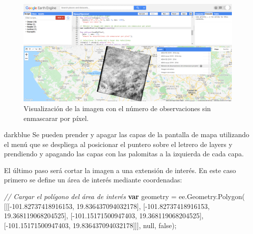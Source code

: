 \documentclass[
  12pt,
  letterpaper,
  twoside]{book}
\newenvironment{Shaded}{\begin{snugshade}}{\end{snugshade}}
\newcommand{\AttributeTok}[1]{\textcolor[rgb]{0.48,0.12,0.64}{#1}}
\newcommand{\CommentTok}[1]{\textcolor[rgb]{0.24,0.58,0.00}{\textit{#1}}}
\newcommand{\ControlFlowTok}[1]{\textcolor[rgb]{0.00,0.00,0.00}{\textbf{#1}}}
\newcommand{\FloatTok}[1]{\textcolor[rgb]{0.28,0.53,0.93}{#1}}
\newcommand{\FunctionTok}[1]{\textcolor[rgb]{0.48,0.12,0.64}{#1}}
\newcommand{\KeywordTok}[1]{\textcolor[rgb]{0.48,0.12,0.64}{#1}}
\newcommand{\NormalTok}[1]{#1}
\newcommand{\OperatorTok}[1]{\textcolor[rgb]{0.00,0.00,0.00}{#1}}
\begin{document}
\begin{figure}[H]

{\centering \includegraphics[width=0.95\linewidth]{Img/imCount} 

}

\caption{Visualización de la imagen con el número de observaciones sin enmascarar por píxel.}\label{fig:f1021}
\end{figure}

\begin{bluebox2}

\begin{awesomeblock}{5pt}{\faLightbulb}{darkblue}
Se pueden prender y apagar las capas de la pantalla de mapa utilizando el menú que se despliega al posicionar el puntero sobre el letrero de layers y prendiendo y apagando las capas con las palomitas a la izquierda de cada capa.

\end{awesomeblock}

\end{bluebox2}

El último paso será cortar la imagen a una extensión de interés. En este caso primero se define un área de interés mediante coordenadas:

\begin{Shaded}
\begin{Highlighting}[]
\CommentTok{// Cargar el polígono del área de interés}
\ControlFlowTok{var}\NormalTok{ geometry }\OperatorTok{=} \KeywordTok{ee}\OperatorTok{.}\AttributeTok{Geometry}\OperatorTok{.}\FunctionTok{Polygon}\NormalTok{(}
\NormalTok{        [[[}\OperatorTok{{-}}\FloatTok{101.82737418916153}\OperatorTok{,} \FloatTok{19.836437094032178}\NormalTok{]}\OperatorTok{,}
\NormalTok{          [}\OperatorTok{{-}}\FloatTok{101.82737418916153}\OperatorTok{,} \FloatTok{19.368119068204525}\NormalTok{]}\OperatorTok{,}
\NormalTok{          [}\OperatorTok{{-}}\FloatTok{101.15171500947403}\OperatorTok{,} \FloatTok{19.368119068204525}\NormalTok{]}\OperatorTok{,}
\NormalTok{          [}\OperatorTok{{-}}\FloatTok{101.15171500947403}\OperatorTok{,} \FloatTok{19.836437094032178}\NormalTok{]]]}\OperatorTok{,} \KeywordTok{null}\OperatorTok{,} \KeywordTok{false}\NormalTok{)}\OperatorTok{;}
\end{Highlighting}
\end{Shaded}
\end{document}
